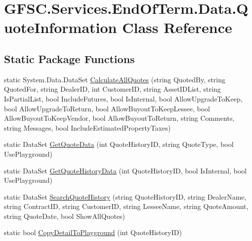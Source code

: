 \hypertarget{class_g_f_s_c_1_1_services_1_1_end_of_term_1_1_data_1_1_quote_information}{}\section{G\+F\+S\+C.\+Services.\+End\+Of\+Term.\+Data.\+Quote\+Information Class Reference}
\label{class_g_f_s_c_1_1_services_1_1_end_of_term_1_1_data_1_1_quote_information}
\subsection*{Static Package Functions}
\begin{DoxyCompactItemize}
\item 
static System.\+Data.\+Data\+Set \mbox{\hyperlink{class_g_f_s_c_1_1_services_1_1_end_of_term_1_1_data_1_1_quote_information_a9c790d1d15350cb153195562c0ee980a}{Calculate\+All\+Quotes}} (string Quoted\+By, string Quoted\+For, string Dealer\+ID, int Customer\+ID, string Asset\+I\+D\+List, string Is\+Partial\+List, bool Include\+Futures, bool Is\+Internal, bool Allow\+Upgrade\+To\+Keep, bool Allow\+Upgrade\+To\+Return, bool Allow\+Buyout\+To\+Keep\+Lessee, bool Allow\+Buyout\+To\+Keep\+Vendor, bool Allow\+Buyout\+To\+Return, string Comments, string Messages, bool Include\+Estimated\+Property\+Taxes)
\item 
static Data\+Set \mbox{\hyperlink{class_g_f_s_c_1_1_services_1_1_end_of_term_1_1_data_1_1_quote_information_a85918123c09ab5bd849b18fa44f781bd}{Get\+Quote\+Data}} (int Quote\+History\+ID, string Quote\+Type, bool Use\+Playground)
\item 
static Data\+Set \mbox{\hyperlink{class_g_f_s_c_1_1_services_1_1_end_of_term_1_1_data_1_1_quote_information_a73e205c52cf16b25509865336a39d754}{Get\+Quote\+History\+Data}} (int Quote\+History\+ID, bool Is\+Internal, bool Use\+Playground)
\item 
static Data\+Set \mbox{\hyperlink{class_g_f_s_c_1_1_services_1_1_end_of_term_1_1_data_1_1_quote_information_a3de8655f1cf1d8a6fe724955f29586e1}{Search\+Quote\+History}} (string Quote\+History\+ID, string Dealer\+Name, string Contract\+ID, string Customer\+ID, string Lessee\+Name, string Quote\+Amount, string Quote\+Date, bool Show\+All\+Quotes)
\item 
static bool \mbox{\hyperlink{class_g_f_s_c_1_1_services_1_1_end_of_term_1_1_data_1_1_quote_information_a43a6a2ecc5ac359238dd44b6963237b9}{Copy\+Detail\+To\+Playground}} (int Quote\+History\+ID)

\end{DoxyCompactItemize}
